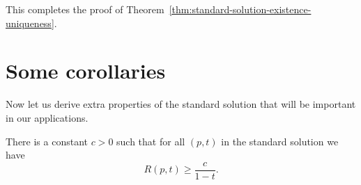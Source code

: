 This completes the proof of Theorem~\ref{thm:standard-solution-existence-uniqueness}.

\section{Some corollaries}

Now let us derive extra properties of the standard solution that
will be important in our applications.

\begin{proposition}
\label{prop:standard-solution-scalar-curvature-lower-bound}
\label{Restim}
There is a constant $c>0$ such that for all $(p,t)$ in the standard
solution we have
$$R(p,t)\ge \frac{c}{1-t}.$$
\end{proposition}

